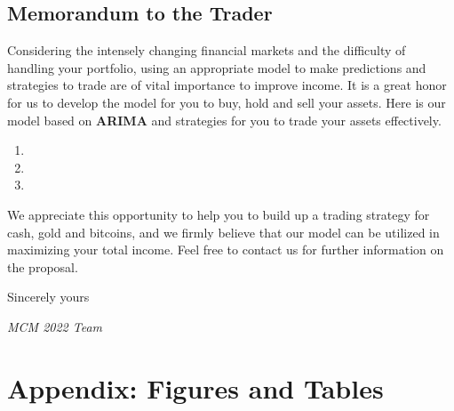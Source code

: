 \documentclass[12pt,a4paper]{article}
\newcommand{\Predictor}{ARIMA }
\begin{document}
\begin{spacing}{1.2}
{\centering\section*{Memorandum to the Trader}}

Considering the intensely changing financial markets and the difficulty of handling your portfolio, using an appropriate model to make predictions and strategies to trade are of vital importance to improve income. It is a great honor for us to develop the model for you to buy, hold and sell your assets. Here is our model based on \textbf{\Predictor} and strategies for you to trade your assets effectively.  

\begin{enumerate}
	\item 
	
	\item
	
	\item
\end{enumerate}

We appreciate this opportunity to help you to build up a trading strategy for cash, gold and bitcoins, and we firmly believe that our model can be utilized in maximizing your total income. Feel free to contact us for further information on the proposal.

Sincerely yours

\textit{MCM 2022 Team}



\end{spacing}


\newpage
\appendix
\addtocounter{page}{-1}
\thispagestyle{empty}

\section*{Appendix: Figures and Tables}
\label{sec:AppendixFT}
\end{document}
